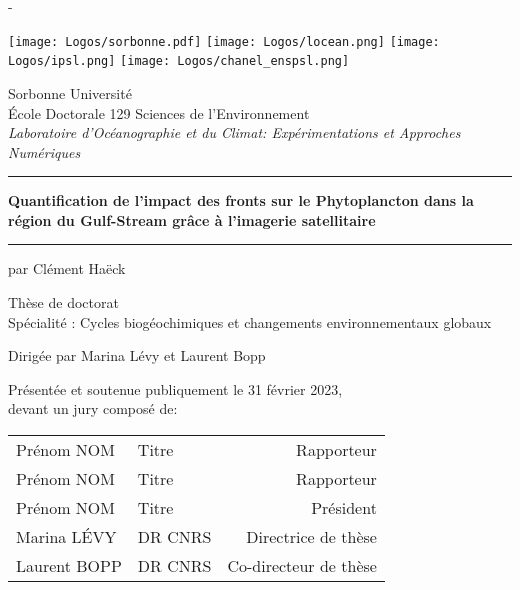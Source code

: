 \documentclass[french, a4paper, 12pt, twoside, openright]{memoir}
\newcommand\Title{Quantification de l'impact des fronts sur le Phytoplancton dans la région du Gulf-Stream grâce à l'imagerie satellitaire}
\begin{document}

\begin{titlingpage}
\calccentering{\unitlength}
\begin{adjustwidth*}{\unitlength}{-\unitlength}

\vspace{-2em}

\begin{center}
  \texttt{[image: Logos/sorbonne.pdf]}
  \hfill
  \texttt{[image: Logos/locean.png]}
  \hfill
  \texttt{[image: Logos/ipsl.png]}
  \hfill
  \texttt{[image: Logos/chanel\_enspsl.png]}

  \vspace{3em}

  {\LARGE Sorbonne Université}\\[2ex]
  École Doctorale 129 Sciences de l'Environnement\\
  \emph{Laboratoire d'Océanographie et du Climat: Expérimentations et Approches Numériques}

  \vspace{3em}

  \par\noindent\rule[0.7em]{\textwidth}{2pt}
  {\bfseries\Large \Title}\\
  \par\noindent\rule{\textwidth}{2pt}

  \vspace{1em}

  {\normalsize par Clément Haëck}\\
  \vspace{3em}

  Thèse de doctorat\\
  Spécialité : Cycles biogéochimiques et changements environnementaux globaux

  \vspace{3em}

  Dirigée par Marina Lévy et Laurent Bopp

  \vspace{3em}
\end{center}

Présentée et soutenue publiquement le 31 février 2023,\\
devant un jury composé de:\\[1ex]
\begin{center}
\begin{tabular}{llr<{\raggedleft}}
  Prénom NOM & Titre & Rapporteur \\
  Prénom NOM & Titre & Rapporteur \\
  Prénom NOM & Titre & Président \\
  Marina LÉVY & DR CNRS & Directrice de thèse \\
  Laurent BOPP & DR CNRS & Co-directeur de thèse \\
\end{tabular}
\end{center}

\end{adjustwidth*}
\end{titlingpage}
\end{document}
